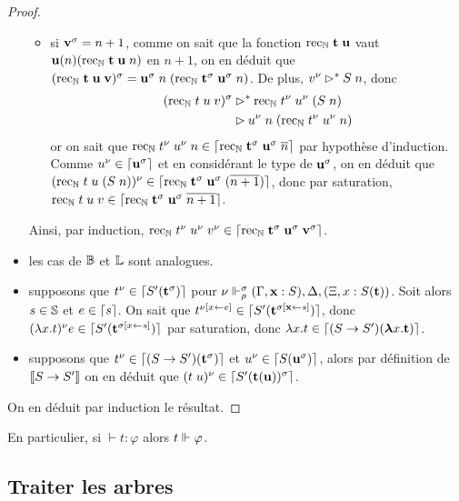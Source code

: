 \documentclass{article}
\begin{document}
\begin{proof}
\begin{itemize}
\begin{itemize}
    \item si $\mathbf{v}^\sigma = n + 1$, comme on sait que la fonction $\mathrm{rec}_{\mathbb{N}}\;\mathbf{t}\;\mathbf{u}$ vaut $\mathbf{u}(n)(\mathrm{rec}_{\mathbb{N}}\;\mathbf{t}\;\mathbf{u}\;n)$ en $n+1$, on en déduit  que $(\mathrm{rec}_{\mathbb{N}}\;\mathbf{t}\;\mathbf{u}\;\mathbf{v})^\sigma = \mathbf{u}^\sigma\;n\;(\mathrm{rec}_{\mathbb{N}}\;\mathbf{t}^\sigma\;\mathbf{u}^\sigma\;n)$. De plus, $v^\nu \rhd^* S\;n$, donc
      \begin{align*}
        (\mathrm{rec}_{\mathbb{N}}\;t\;u\;v)^\sigma &\rhd^* \mathrm{rec}_{\mathbb{N}}\;t^\nu\;u^\nu\;(S\;n)\\
        &\rhd u^\nu\;n\;(\mathrm{rec}_{\mathbb{N}}\;t^\nu\;u^\nu\;n)
      \end{align*}
      or on sait que $\mathrm{rec}_{\mathbb{N}}\;t^\nu\;u^\nu\;n\in\lceil \mathrm{rec}_{\mathbb{N}}\;\mathbf{t}^\sigma\;\mathbf{u}^\sigma\;\overline n \rceil$ par hypothèse d'induction. Comme $u^\nu \in \lceil \mathbf{u}^\sigma \rceil$ et en considérant le type de $\mathbf{u}^\sigma$, on en déduit que $(\mathrm{rec}_{\mathbb{N}}\;t\;u\;(S\;n))^\nu \in \lceil \mathrm{rec}_{\mathbb{N}}\;\mathbf{t}^\sigma\;\mathbf{u}^\sigma\;(\overline{n+1}) \rceil$, donc par saturation, $\mathrm{rec}_{\mathbb{N}}\;t\;u\;v\in\lceil \mathrm{rec}_{\mathbb{N}}\;\mathbf{t}^\sigma\;\mathbf{u}^\sigma\;\overline{n+1} \rceil$.
    \end{itemize}
    Ainsi, par induction, $\mathrm{rec}_{\mathbb{N}}\;t^\nu\;u^\nu\;v^\nu \in \lceil \mathrm{rec}_{\mathbb{N}}\;\mathbf{t}^\sigma\;\mathbf{u}^\sigma\;\mathbf{v}^\sigma \rceil$.
  \item les cas de $\mathbb{B}$ et $\mathbb{L}$ sont analogues.
  \item supposons que $t^\nu\in\lceil S'(\mathbf{t}^\sigma) \rceil$ pour $\nu\Vdash_\rho^\sigma (\Gamma, \mathbf{x} : S), \Delta,(\Xi, x : S(\mathbf{t}))$. Soit alors $s\in\mathbb{S}$ et $e\in \lceil s \rceil$. On sait que $t^{\nu[x\leftarrow e]}\in\lceil S'(\mathbf{t}^{\sigma[\mathbf{x}\leftarrow s]}) \rceil$, donc $(\lambda x.t)^\nu e \in \lceil S'(\mathbf{t}^{\sigma[x\leftarrow s]}) \rceil$ par saturation, donc $\lambda x.t\in\lceil (S\to S')(\boldsymbol{\lambda} x.\mathbf{t}) \rceil$.
  \item supposons que $t^\nu \in\lceil (S\to S')(\mathbf{t}^\sigma) \rceil$ et $u^\nu \in\lceil S(\mathbf{u}^\sigma) \rceil$, alors par définition de $\llbracket S\to S' \rrbracket$ on en déduit que $(t\;u)^\nu\in\lceil S'(\mathbf{t}(\mathbf{u}))^\sigma \rceil$.
  \end{itemize}

  On en déduit par induction le résultat.
\end{proof}

En particulier, si $\vdash t : \varphi$ alors $t\Vdash \varphi$.

\subsection{Traiter les arbres}
\end{document}
